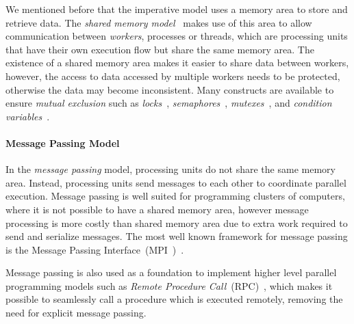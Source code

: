 We mentioned before that the imperative model uses a memory area to store and
retrieve data. The \emph{shared memory model}~\cite{Mellor-Crummey:1991} makes
use of this area to allow communication between \emph{workers}, processes or
threads, which are processing units that have their own execution flow but share
the same memory area. The existence of a shared memory area makes it easier to
share data between workers, however, the access to data accessed by multiple
workers needs to be protected, otherwise the data may become inconsistent. Many
constructs are available to ensure \emph{mutual exclusion} such as
\emph{locks}~\cite{Silberschatz:2008}, \emph{semaphores}~\cite{Dijkstra:2002},
\emph{mutexes}~\cite{Silberschatz:2008}, and \emph{condition
variables}~\cite{Hoare:1974}.

\paragraph{Message Passing Model}

In the \emph{message passing} model, processing units do not share the same
memory area. Instead, processing units send messages to each other to coordinate
parallel execution. Message passing is well suited for programming clusters of
computers, where it is not possible to have a shared memory area, however
message processing is more costly than shared memory area due to extra work
required to send and serialize messages.  The most well known framework for
message passing is the Message Passing Interface~(MPI~)~\cite{Forum:1994}.

Message passing is also used as a foundation to implement higher level parallel
programming models such as \emph{Remote Procedure
Call}~(RPC)~\cite{Birrell:1984}, which makes it possible to seamlessly call a
procedure which is executed remotely, removing the need for explicit message
passing.

